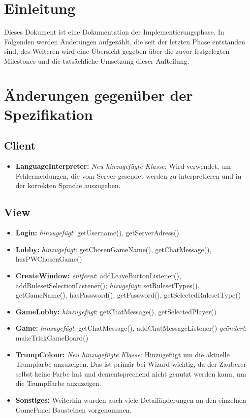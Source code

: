 \documentclass{article}
\begin{document}
\tableofcontents
\newpage

\section{Einleitung}
Dieses Dokument ist eine Dokumentation der Implementierungsphase. In Folgenden werden Änderungen aufgezählt, die seit der letzten Phase entstanden sind, des Weiteren wird eine Übersicht gegeben über die zuvor festgelegten Milestones und die tatsächliche Umsetzung dieser Aufteilung.

\section{Änderungen gegenüber der Spezifikation}

\subsection{Client}

\begin{itemize}
\item  \textbf{LanguageInterpreter:}  \textit{Neu hinzugefügte Klasse}: Wird verwendet, um Fehlermeldungen, die vom Server gesendet werden zu interpretieren und in der korrekten Sprache auszugeben.
\end{itemize}

\subsection{View}

\begin{itemize}
\item \textbf{Login:} \textit{hinzugefügt}: getUsername(), getServerAdress()
\item \textbf{Lobby:} \textit{hinzugefügt}: getChosenGameName(), getChatMessage(), hasPWChosenGame()
\item \textbf{CreateWindow:} \textit{entfernt}: addLeaveButtonListener(), addRulesetSelectionListener(); \textit{hizugefügt}: setRulesetTypes(), getGameName(), hasPassword(), getPassword(), getSelectedRulesetType()
\item \textbf{GameLobby:} \textit{hinzugefügt}: getChatMessage(), getSelectedPlayer()
\item \textbf{Game:} \textit{hinzugefügt}: getChatMessage(), addChatMessageListener() \textit{geändert}: makeTrickGameBoard()
\item \textbf{TrumpColour:} \textit{Neu hinzugefügte Klasse}: Hinzugefügt um die aktuelle Trumpfarbe anzuzeigen. Das ist primär bei Wizard wichtig, da der Zauberer selbst keine Farbe hat und dementsprechend nicht genutzt werden kann, um die Trumpffarbe anzuzeigen.
\item \textbf{Sonstiges:} Weiterhin wurden auch viele Detailänderungen an den einzelnen GamePanel Bausteinen vorgenommen.
\end{itemize}
\end{document}
